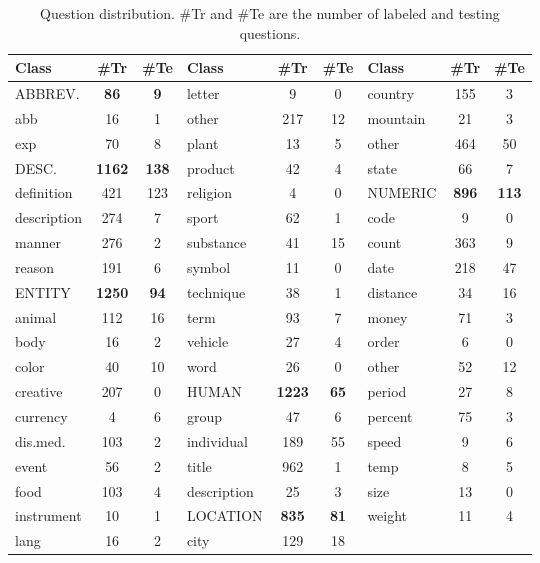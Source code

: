 \documentclass[english]{jnlp_1.4}
\begin{document}
\begin{table}[t]
\centering \caption{Question distribution. \#Tr and \#Te are the
number of labeled and testing questions.} \label{datadistribution}
\begin{tabular}{|l|c|c|l|c|c|l|c|c|}
\hline
\hspace{0.18in}Class & \#Tr & \#Te & \hspace{0.18in}Class & \#Tr & \#Te & \hspace{0.18in}Class & \#Tr & \#Te \\
\hline
ABBREV. & \textbf{86} & \textbf{9} & letter &  9 &  0 &  country & 155 & 3 \\
abb & 16 & 1 & other &  217 &  12 & mountain & 21 & 3  \\
exp & 70 & 8 & plant &  13 &  5 & other & 464 & 50 \\
DESC. & \textbf{1162} & \textbf{138} & product &  42 &  4 & state & 66 & 7 \\
definition & 421 & 123 & religion &  4 &  0 &  NUMERIC &  \textbf{896} &  \textbf{113}   \\
description & 274 & 7 & sport &  62 &  1 & code &  9 &  0 \\
manner & 276 & 2 & substance &  41 &  15 & count &  363 &  9 \\
reason & 191 & 6 & symbol &  11 &  0 & date &  218 &  47  \\
ENTITY & \textbf{1250} & \textbf{94} & technique &  38 &  1 & distance &  34 &  16  \\
animal & 112 & 16 & term & 93 & 7 &  money &  71 &  3\\
body & 16 & 2 & vehicle & 27 & 4 &  order &  6 &  0 \\
color & 40 & 10 & word & 26 & 0 & other &  52 &  12 \\
creative & 207 & 0 & HUMAN & \textbf{1223} & \textbf{65} &  period &  27 &  8  \\
currency & 4 & 6 & group & 47 & 6 &  percent &  75 &  3 \\
dis.med. &  103 &  2 & individual & 189 & 55 &  speed &  9 &  6 \\
event &  56 &  2 & title & 962 & 1 &  temp &  8 &  5 \\
food &  103 &  4 & description & 25 & 3 & size &  13 &  0  \\
instrument &  10 &  1 & LOCATION & \textbf{835} & \textbf{81} &  weight &  11 & 4  \\
lang &  16 &  2 & city & 129 & 18 & & &  \\
\hline
\end{tabular}
\end{table}
\end{document}
